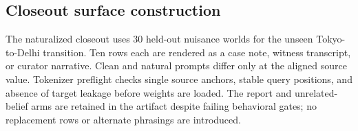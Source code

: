 \documentclass[10pt]{article}
\begin{document}
\subsection{Closeout surface construction}

The naturalized closeout uses 30 held-out nuisance worlds for the unseen
Tokyo-to-Delhi transition. Ten rows each are rendered as a case note, witness
transcript, or curator narrative. Clean and natural prompts differ only at the
aligned source value. Tokenizer preflight checks single source anchors, stable
query positions, and absence of target leakage before weights are loaded. The
report and unrelated-belief arms are retained in the artifact despite failing
behavioral gates; no replacement rows or alternate phrasings are introduced.
\end{document}
